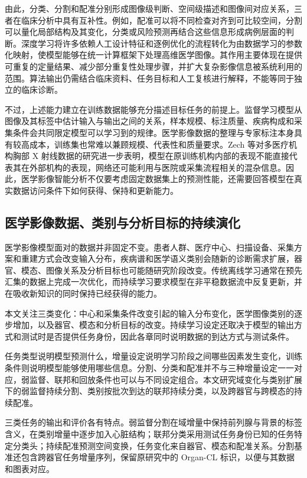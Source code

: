由此，分类、分割和配准分别形成图像级判断、空间级描述和图像间对应关系，三者在临床分析中具有互补性。例如，配准可以将不同检查对齐到可比较空间，分割可以量化局部结构及其变化，分类或风险预测再结合这些信息形成病例层面的判断。深度学习将许多依赖人工设计特征和逐例优化的流程转化为由数据学习的参数化映射，使模型能够在统一计算框架下处理高维医学图像。其作用主要体现在提供可重复的定量结果、减少部分重复性处理步骤，并扩大复杂影像信息被系统利用的范围。算法输出仍需结合临床资料、任务目标和人工复核进行解释，不能等同于独立的临床诊断。

不过，上述能力建立在训练数据能够充分描述目标任务的前提上。监督学习模型从图像及其标签中估计输入与输出之间的关系，样本规模、标注质量、疾病构成和采集条件会共同限定模型可以学习到的规律。医学影像数据的整理与专家标注本身具有较高成本，训练集也常难以兼顾规模、代表性和质量要求\cite{willemink2020preparing}。Zech 等对多医疗机构胸部 X 射线数据的研究进一步表明，模型在原训练机构内部的表现不能直接代表其在外部机构的表现，网络还可能利用与医院或采集流程相关的混杂信息\cite{zech2018variable}。因此，医学影像智能分析不仅要考虑固定数据集上的预测性能，还需要回答模型在真实数据访问条件下如何获得、保持和更新能力。

\subsection{医学影像数据、类别与分析目标的持续演化}
\label{subsec:intro-evolving-tasks}

医学影像模型面对的数据并非固定不变。患者人群、医疗中心、扫描设备、采集方案和重建方式会改变输入分布，疾病谱和医学语义类别会随新的诊断需求扩展，器官、模态、图像关系及分析目标也可能随研究阶段改变。传统离线学习通常在预先汇集的数据上完成一次优化，而持续学习要求模型在非平稳数据流中反复更新，并在吸收新知识的同时保持已经获得的能力\cite{hadsell2020embracing,vandeven2022three}。

本文关注三类变化：中心和采集条件改变引起的输入分布变化，医学图像类别的逐步增加，以及器官、模态和分析目标的改变。持续学习设定还取决于模型的输出方式和测试时是否提供任务身份，因此各章同时说明数据的到达方式与测试条件\cite{vandeven2022three,delange2022continual}。

任务类型说明模型预测什么，增量设定说明学习阶段之间哪些因素发生变化，训练条件则说明模型能够使用哪些信息。分割、分类和配准并不与三种增量设定一一对应，弱监督、联邦和回放条件也可以与不同设定组合。本文研究域变化与类别扩展下的弱监督持续分割、类别按批次到达的联邦持续分类，以及跨器官与跨模态的持续配准。

三类任务的输出和评价各有特点。弱监督分割在域增量中保持前列腺与背景的标签含义，在类别增量中逐步加入心脏结构；联邦分类采用测试任务身份已知的任务特定分类头；持续配准预测空间变换，任务变化来自器官、模态和配准关系。分割基准还包含跨器官任务增量序列，保留原研究中的 Organ-CL 标识，以便与其数据和图表对应。

